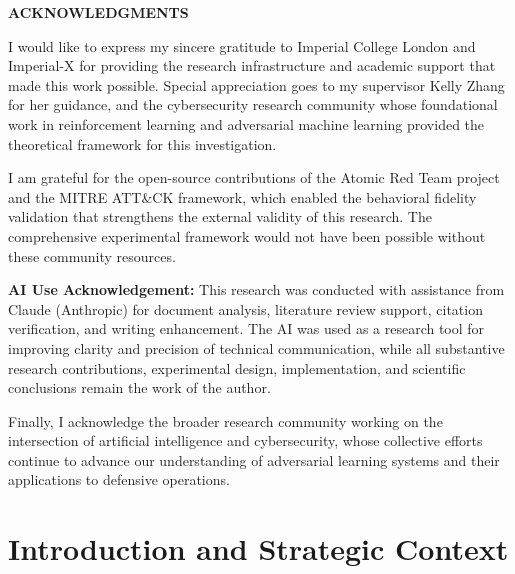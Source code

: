 \documentclass[12pt,oneside]{article}
\begin{document}
\clearpage
\begin{center}
\large\textbf{ACKNOWLEDGMENTS}
\end{center}

\vspace{1em}

I would like to express my sincere gratitude to Imperial College London and Imperial-X for providing the research infrastructure and academic support that made this work possible. Special appreciation goes to my supervisor Kelly Zhang for her guidance, and the cybersecurity research community whose foundational work in reinforcement learning and adversarial machine learning provided the theoretical framework for this investigation.

I am grateful for the open-source contributions of the Atomic Red Team project and the MITRE ATT\&CK framework, which enabled the behavioral fidelity validation that strengthens the external validity of this research. The comprehensive experimental framework would not have been possible without these community resources.

\textbf{AI Use Acknowledgement:} This research was conducted with assistance from Claude (Anthropic) for document analysis, literature review support, citation verification, and writing enhancement. The AI was used as a research tool for improving clarity and precision of technical communication, while all substantive research contributions, experimental design, implementation, and scientific conclusions remain the work of the author.

Finally, I acknowledge the broader research community working on the intersection of artificial intelligence and cybersecurity, whose collective efforts continue to advance our understanding of adversarial learning systems and their applications to defensive operations.

\clearpage

\listoffigures
\clearpage

\listoftables
\clearpage

\setcounter{page}{1}
\pagestyle{fancy}
\fancyhf{}
\fancyfoot[C]{\thepage}
\clearpage
\section{Introduction and Strategic Context}
\end{document}
